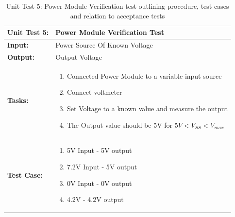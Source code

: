 \begin{table}[H]
    \centering
    \caption{Unit Test 5: Power Module Verification test outlining procedure, test cases and relation to acceptance tests}
    \begin{tabular}{|m{}|m{}|}
    \hline
       \textbf{Unit Test 5: }  &  Power Module Verification Test\\
       \hline
        \textbf{Input: } &  Power Source Of Known Voltage\\
        \hline
        \textbf{Output: } & Output Voltage\\
        \hline
        \textbf{Tasks: } & \begin{enumerate}
        \vspace{1mm}
            \item Connected Power Module to a variable input source
            \item Connect voltmeter
            \item Set Voltage to a known value and measure the output
            \item The Output value should be 5V for $5V < V_{SS} < V_{max}$ 
        \end{enumerate}\\
        \hline
        \textbf{Test Case: } & \begin{enumerate}
            \vspace{1mm}
            \item 5V Input - 5V output
            \item 7.2V Input - 5V output
            \item 0V Input - 0V output
            \item 4.2V - 4.2V output
        \end{enumerate}\\
        \hline
    \end{tabular}

    \label{tab:UT005}
\end{table}

